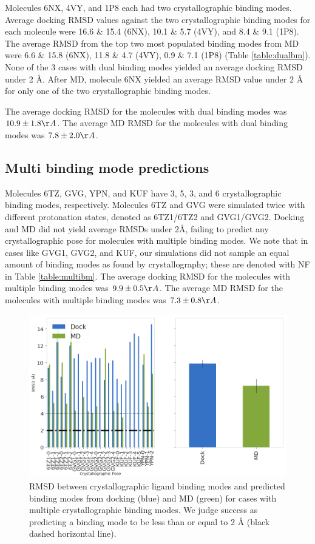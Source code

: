 Molecules 6NX, 4VY, and 1P8 each had two crystallographic binding modes.
Average docking RMSD values against the two crystallographic binding modes for each molecule were 16.6 \& 15.4 (6NX), 10.1 & 5.7 (4VY), and 8.4 \& 9.1 (1P8).
The average RMSD from the top two most populated binding modes from MD were 6.6 & 15.8 (6NX), 11.8 \& 4.7 (4VY), 0.9 \& 7.1 (1P8) (Table \ref{table:dualbm}).
None of the 3 cases with dual binding modes yielded an average docking RMSD under 2 {\AA}.
After MD, molecule 6NX yielded an average RMSD value under 2 {\AA} for only one of the two crystallographic binding modes. 

The average docking RMSD for the molecules with dual binding modes was $10.9 \pm 1.8 {\AA}$.
The average MD RMSD for the molecules with dual binding modes was $7.8 \pm 2.0 {\AA}$. 

\subsection{Multi binding mode predictions}

Molecules 6TZ, GVG, YPN, and KUF have 3, 5, 3, and 6 crystallographic binding modes, respectively.
Molecules 6TZ and GVG were simulated twice with different protonation states, denoted as 6TZ1/6TZ2 and GVG1/GVG2. 
Docking and MD did not yield average RMSDs under 2{\AA}, failing to predict any crystallographic pose for molecules with multiple binding modes.
We note that in cases like GVG1, GVG2, and KUF, our simulations did not sample an equal amount of binding modes as found by crystallography; these are denoted with NF in Table \ref{table:multibm}.
The average docking RMSD for the molecules with multiple binding modes was $9.9 \pm 0.5 {\AA}$.
The average MD RMSD for the molecules with multiple binding modes was $7.3 \pm 0.8 {\AA}$. 

\begin{figure}
    \centering
    \includegraphics[width=\linewidth]{chapter5/Figures/cluster3_seh_multibm.png}
    \caption[SEH MD Multi Binding Mode Ligands]{RMSD between crystallographic ligand binding modes and predicted binding modes from docking (blue) and MD (green) for cases with multiple crystallographic binding modes. We judge success as predicting a binding mode to be less than or equal to 2 {\AA} (black dashed horizontal line).}
    \label{fig:rmsd-multibm}
\end{figure}

